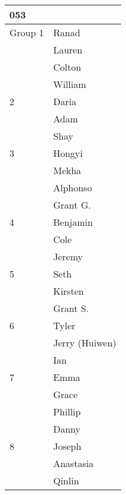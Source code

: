\documentclass{standalone}
\begin{document}
	\begin{tabular}{l|l}
	053&\\	\hline Group 1
&Ranad\\
&Lauren\\
&Colton\\
&William \\
\hline 2
&Daria\\
&Adam\\
&Shay\\
\hline 3
&Hongyi\\
&Mekha\\
&Alphonso\\
&Grant G.\\
\hline 4
&Benjamin\\
&Cole\\
&Jeremy\\
\hline 5
&Seth\\
&Kirsten\\
&Grant S.\\
\hline 6
&Tyler\\
&Jerry (Huiwen)\\
&Ian\\
\hline 7
&Emma\\
&Grace\\
&Phillip\\
&Danny\\
\hline 8
&Joseph\\
&Anastasia\\
&Qinlin
\end{tabular}
\end{document}
